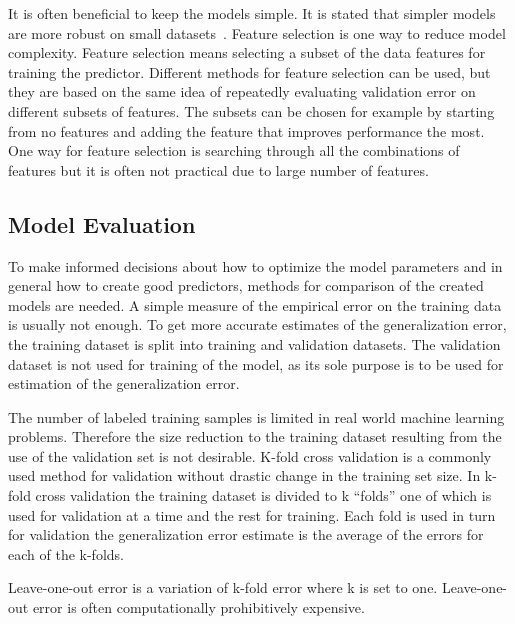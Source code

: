 It is often beneficial to keep the models simple. It is stated that simpler models are more robust on small datasets~\cite{alpaydin:2004:introduction}. Feature selection is one way to reduce model complexity. Feature selection means selecting a subset of the data features for training the predictor. Different methods for feature selection can be used, but they are based on the same idea of repeatedly evaluating validation error on different subsets of features. The subsets can be chosen for example by starting from no features and adding the feature that improves performance the most. One way for feature selection is searching through all the combinations of features but it is often not practical due to large number of features.~\cite{alpaydin:2004:introduction}

\subsection{Model Evaluation}
To make informed decisions about how to optimize the model parameters and in general how to create good predictors, methods for comparison of the created models are needed. A simple measure of the empirical error on the training data is usually not enough. To get more accurate estimates of the generalization error, the training dataset is split into training and validation datasets. The validation dataset is not used for training of the model, as its sole purpose is to be used for estimation of the generalization error.~\cite{alpaydin:2004:introduction}

The number of labeled training samples is limited in real world machine learning problems. Therefore the size reduction to the training dataset resulting from the use of the validation set is not desirable. K-fold cross validation is a commonly used method for validation without drastic change in the training set size. In k-fold cross validation the training dataset is divided to k ``folds'' one of which is used for validation at a time and the rest for training. Each fold is used in turn for validation the generalization error estimate is the average of the errors for each of the k-folds.~\cite{alpaydin:2004:introduction}

Leave-one-out error is a variation of k-fold error where k is set to one. Leave-one-out error is often computationally prohibitively expensive.

